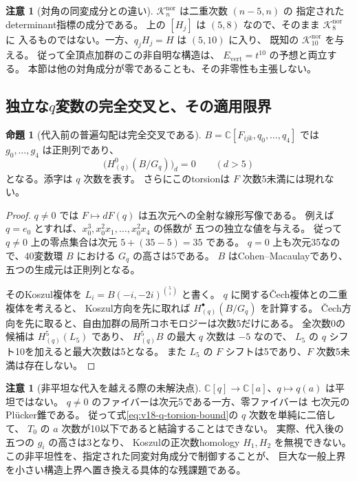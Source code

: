 \documentclass[a4paper,11pt]{ltjsarticle}
\theoremstyle{definition}
\newtheorem{remark}[theorem]{注意}
\newtheorem{proposition}[theorem]{命題}
\newcommand{\CC}{\mathbb C}
\begin{document}
\begin{remark}[対角の同変成分との違い]
$\mathcal K_n^{\mathrm{nor}}$ は二重次数 $(n-5,n)$ の
指定されたdeterminant指標の成分である。
上の $[H_j]$ は $(5,8)$ なので、そのまま $\mathcal K_8^{\mathrm{nor}}$ に
入るものではない。一方、$q_jH_j=H$ は $(5,10)$ に入り、
既知の $\mathcal K_{10}^{\mathrm{nor}}$ を与える。
従って全頂点加群のこの非自明な構造は、
$E_{\mathrm{vert}}=t^{10}$ の予想と両立する。
本節は他の対角成分が零であることも、その非零性も主張しない。
\end{remark}

\subsection{独立な$q$変数の完全交叉と、その適用限界}

\begin{proposition}[代入前の普遍勾配は完全交叉である]
\label{prop:v18-universal-q-CI}
$B=\CC[F_{ijk},q_0,\ldots,q_4]$ では $g_0,\ldots,g_4$ は正則列であり、
\begin{equation}\label{eq:v18-q-torsion-bound}
 \bigl(H^0_{(q)}(B/G_q)\bigr)_d=0\qquad(d>5)
\end{equation}
となる。添字は $q$ 次数を表す。
さらにこのtorsionは $F$ 次数5未満には現れない。
\end{proposition}

\begin{proof}
$q\ne0$ では $F\mapsto dF(q)$ は五次元への全射な線形写像である。
例えば $q=e_0$ とすれば、$x_0^3,x_0^2x_1,\ldots,x_0^2x_4$ の係数が
五つの独立な値を与える。
従って $q\ne0$ 上の零点集合は次元 $5+(35-5)=35$ である。
$q=0$ 上も次元35なので、40変数環 $B$ における $G_q$ の高さは5である。
$B$ はCohen--Macaulayであり、五つの生成元は正則列となる。

そのKoszul複体を $L_i=B(-i,-2i)^{\binom5i}$ と書く。
$q$ に関するČech複体との二重複体を考えると、
Koszul方向を先に取れば $H^\bullet_{(q)}(B/G_q)$ を計算する。
Čech方向を先に取ると、自由加群の局所コホモロジーは次数5だけにある。
全次数0の候補は $H^5_{(q)}(L_5)$ であり、
$H^5_{(q)}B$ の最大 $q$ 次数は $-5$ なので、
$L_5$ の $q$ シフト10を加えると最大次数は5となる。
また $L_5$ の $F$ シフトは5であり、$F$ 次数5未満は存在しない。
\end{proof}

\begin{remark}[非平坦な代入を越える際の未解決点]
$\CC[q]\to\CC[a]$、$q\mapsto q(a)$ は平坦ではない。
$q\ne0$ のファイバーは次元5である一方、零ファイバーは
七次元のPl\"ucker錐である。
従って式\eqref{eq:v18-q-torsion-bound}の $q$ 次数を単純に二倍して、
$T_0$ の $a$ 次数が10以下であると結論することはできない。
実際、代入後の五つの $g_i$ の高さは3となり、
Koszulの正次数homology $H_1,H_2$ を無視できない。
この非平坦性を、指定された同変対角成分で制御することが、
巨大な一般上界を小さい構造上界へ置き換える具体的な残課題である。
\end{remark}
\end{document}
